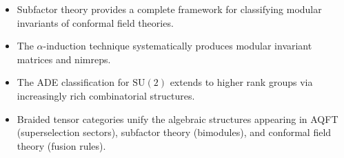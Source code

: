 \documentclass[11pt,a4paper]{article}
\begin{document}
\begin{itemize}[nosep]
  \item Subfactor theory provides a complete framework for classifying
        modular invariants of conformal field theories.
  \item The $\alpha$-induction technique systematically produces modular
        invariant matrices and nimreps.
  \item The ADE classification for $\mathrm{SU}(2)$ extends to higher
        rank groups via increasingly rich combinatorial structures.
  \item Braided tensor categories unify the algebraic structures
        appearing in AQFT (superselection sectors), subfactor theory
        (bimodules), and conformal field theory (fusion rules).
\end{itemize}
\end{document}
